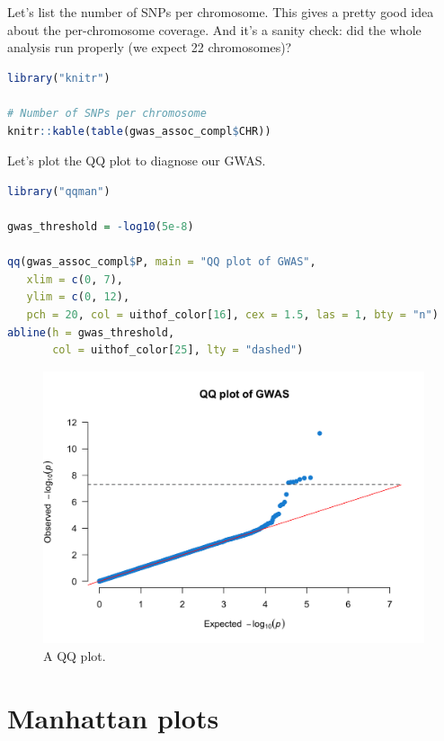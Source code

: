 \documentclass[
]{book}
\begin{document}
Let's list the number of SNPs per chromosome. This gives a pretty good idea about the per-chromosome coverage. And it's a sanity check: did the whole analysis run properly (we expect 22 chromosomes)?

\begin{lstlisting}[language=R]
library("knitr")

# Number of SNPs per chromosome
knitr::kable(table(gwas_assoc_compl$CHR))
\end{lstlisting}

Let's plot the QQ plot to diagnose our GWAS.

\begin{lstlisting}[language=R]
library("qqman")

gwas_threshold = -log10(5e-8)

qq(gwas_assoc_compl$P, main = "QQ plot of GWAS",
   xlim = c(0, 7),
   ylim = c(0, 12),
   pch = 20, col = uithof_color[16], cex = 1.5, las = 1, bty = "n")
abline(h = gwas_threshold,
       col = uithof_color[25], lty = "dashed")
\end{lstlisting}

\begin{figure}

{\centering \includegraphics[width=18.67in]{img/show-qq} 

}

\caption{A QQ plot.}\label{fig:show-qq}
\end{figure}

\hypertarget{manhattan-plots}{%
\section{Manhattan plots}\label{manhattan-plots}}
\end{document}

